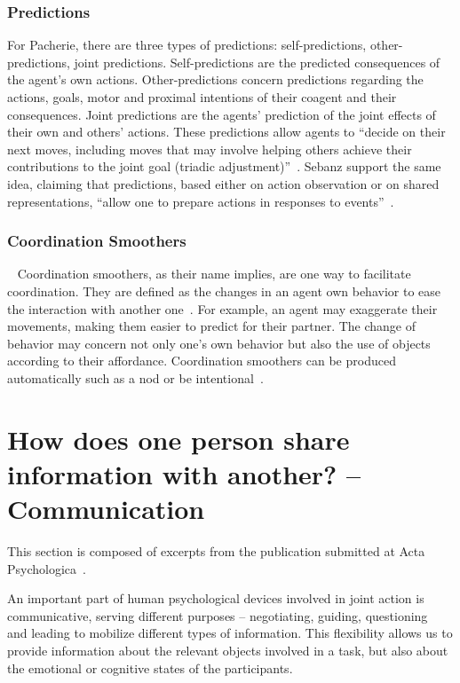\documentclass[a4paper,11pt,twoside]{StyleThese}
\begin{document}
\subsubsection{Predictions}\label{chap1:subsubsec:pred}
For Pacherie, there are three types of predictions: self-predictions, other-predictions, joint predictions. Self-predictions are the predicted consequences of the agent's own actions. Other-predictions concern predictions regarding the actions, goals, motor and proximal intentions of their coagent and their consequences. Joint predictions are the agents' prediction of the joint effects of their own and others' actions. These predictions allow agents to ``decide on their next moves, including moves that may involve helping others achieve their contributions to the joint goal (triadic adjustment)''~\cite[pp.~354-355]{pacherie_2012_agency}. Sebanz \etal{} support the same idea, claiming that predictions, based either on action observation or on shared representations, ``allow one to prepare actions in responses to events''~\cite[p.~73]{sebanz_2006_joint}.

\subsubsection{Coordination Smoothers}~\label{chap1:subsubsec:coord_smooth}
Coordination smoothers, as their name implies, are one way to facilitate coordination. They are defined as the changes in an agent own behavior to ease the interaction with another one~\cite{vesper_2010_minimal}. For example, an agent may exaggerate their movements, making them easier to predict for their partner. The change of behavior may concern not only one's own behavior but also the use of objects according to their affordance. Coordination smoothers can be produced automatically such as a nod or be intentional~\cite{michael_2015_commitments}.

\section{How does one person share information with another? -- Communication}\label{chap1:sec:comm}

This section is composed of excerpts from the publication submitted at Acta Psychologica~\cite{belhassein_2021_adressing}.

An important part of human psychological devices involved in joint action is communicative, serving different purposes – \eg negotiating, guiding, questioning~\cite{austin_1962_how, clark_1992_arenas, sperber_1995_relevance} and leading to mobilize different types of information. This flexibility allows us to provide information about the relevant objects involved in a task, but also about the emotional or cognitive states of the participants. 
\end{document}
